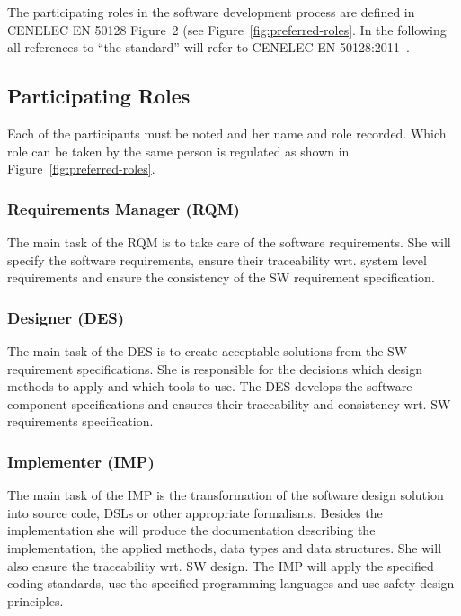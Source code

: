 
The participating roles in the software development process are defined in
CENELEC EN 50128 Figure~2 (see Figure~\ref{fig:preferred-roles}. In the
following all references to ``the standard'' will refer to CENELEC EN
50128:2011~\cite{EN-50128}.

\subsection{Participating Roles}
\label{sec:participating-roles}

Each of the participants must be noted and her name and role recorded. Which
role can be taken by the same person is regulated as shown in
Figure~\ref{fig:preferred-roles}.

\subsubsection{Requirements Manager (RQM)}
\label{sec:requ-magang-rqm}

The main task of the RQM is to take care of the software requirements. She will
specify the software requirements, ensure their traceability wrt. system level
requirements and ensure the consistency of the SW requirement specification.

\subsubsection{Designer (DES)}
\label{sec:designer}

The main task of the DES is to create acceptable solutions from the SW
requirement specifications. She is responsible for the decisions which design
methods to apply and which tools to use. The DES develops the software component
specifications and ensures their traceability and consistency wrt. SW
requirements specification.

\subsubsection{Implementer (IMP)}
\label{sec:implementer}

The main task of the IMP is the transformation of the software design solution
into source code, DSLs or other appropriate formalisms. Besides the
implementation she will produce the documentation describing the implementation,
the applied methods, data types and data structures. She will also ensure the
traceability wrt. SW design. The IMP will apply the specified coding standards,
use the specified programming languages and use safety design principles.


